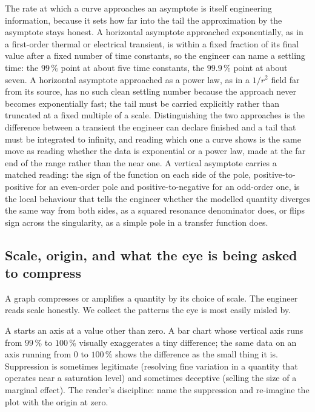 The rate at which a curve approaches an asymptote is itself
engineering information, because it sets how far into the tail the
approximation by the asymptote stays honest. A horizontal asymptote
approached exponentially, as in a first-order thermal or electrical
transient, is within a fixed fraction of its final value after a fixed
number of time constants, so the engineer can name a settling time: the
$99\,\%$ point at about five time constants, the $99.9\,\%$ point at
about seven. A horizontal asymptote approached as a power law, as in a
$1/r^2$ field far from its source, has no such clean settling number
because the approach never becomes exponentially fast; the tail must be
carried explicitly rather than truncated at a fixed multiple of a
scale. Distinguishing the two approaches is the difference between a
transient the engineer can declare finished and a tail that must be
integrated to infinity, and reading which one a curve shows is the same
move as reading whether the data is exponential or a power law, made at
the far end of the range rather than the near one. A vertical asymptote
carries a matched reading: the sign of the function on each side of the
pole, positive-to-positive for an even-order pole and
positive-to-negative for an odd-order one, is the local behaviour that
tells the engineer whether the modelled quantity diverges the same way
from both sides, as a squared resonance denominator does, or flips
sign across the singularity, as a simple pole in a transfer function
does.

\subsection{Scale, origin, and what the eye is being asked to compress}

A graph compresses or amplifies a quantity by its choice of scale.
The engineer reads scale honestly. We collect the patterns the eye is
most easily misled by.

A  starts an axis at a value other than
zero. A bar chart whose vertical axis runs from $99\,\%$ to $100\,\%$
visually exaggerates a tiny difference; the same data on an axis
running from $0$ to $100\,\%$ shows the difference as the small thing
it is. Suppression is sometimes legitimate (resolving fine variation
in a quantity that operates near a saturation level) and sometimes
deceptive (selling the size of a marginal effect). The reader's
discipline: name the suppression and re-imagine the plot with the
origin at zero.

